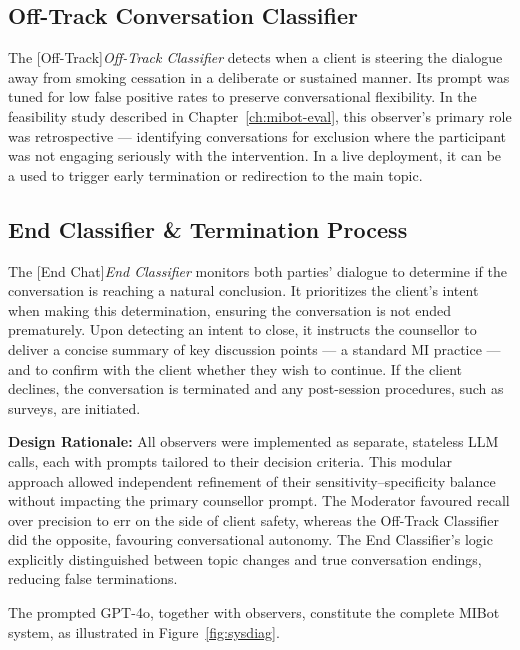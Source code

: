 \subsection{Off-Track Conversation Classifier}
The [Off-Track]\textit{Off-Track Classifier} detects when a client is steering the dialogue away from smoking cessation in a deliberate or sustained manner. Its prompt was tuned for low false positive rates to preserve conversational flexibility. In the feasibility study described in Chapter~\ref{ch:mibot-eval}, this observer's primary role was retrospective --- identifying conversations for exclusion where the participant was not engaging seriously with the intervention. In a live deployment, it can be a used to trigger early termination or redirection to the main topic.

\subsection{End Classifier \& Termination Process}
The [End Chat]\textit{End Classifier} monitors both parties' dialogue to determine if the conversation is reaching a natural conclusion. It prioritizes the client's intent when making this determination, ensuring the conversation is not ended prematurely. Upon detecting an intent to close, it instructs the counsellor to deliver a concise summary of key discussion points --- a standard MI practice --- and to confirm with the client whether they wish to continue. If the client declines, the conversation is terminated and any post-session procedures, such as surveys, are initiated.


\textbf{Design Rationale:} All observers were implemented as separate, stateless LLM calls, each with prompts tailored to their decision criteria. This modular approach allowed independent refinement of their sensitivity–specificity balance without impacting the primary counsellor prompt. The Moderator favoured recall over precision to err on the side of client safety, whereas the Off-Track Classifier did the opposite, favouring conversational autonomy. The End Classifier's logic explicitly distinguished between topic changes and true conversation endings, reducing false terminations.


The prompted GPT-4o, together with observers, constitute the complete MIBot system, as illustrated in Figure~\ref{fig:sysdiag}.





